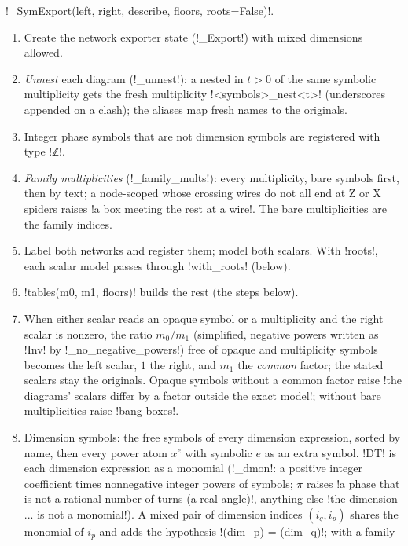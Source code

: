 {{{\begin{algorithm}\label{alg:lean-export-sym-init}
\lexpy!_SymExport(left, right, describe, floors, roots=False)!.
\begin{enumerate}
\item Create the network exporter state (\lexpy!_Export!) with mixed dimensions allowed.
\item \emph{Unnest} each diagram (\lexpy!_unnest!): a \bbox nested in $t>0$ \bboxes of the same
symbolic multiplicity gets the fresh multiplicity \lexcode!<symbols>_nest<t>! (underscores
appended on a clash); the aliases map fresh names to the originals.
\item Integer phase symbols that are not dimension symbols are registered with type
\lexlean!ℤ!.
\item \emph{Family multiplicities} (\lexpy!_family_mults!): every \bbox multiplicity, bare symbols
first, then by text; a node-scoped \bbox whose crossing wires do not all end at Z or X spiders
raises \lexcode!a box meeting the rest at a wire!. The bare multiplicities are the family indices.
\item Label both networks and register them; model both scalars. With \lexpy!roots!, each scalar
model passes through \lexpy!with_roots! (below).
\item \lexpy!tables(m0, m1, floors)! builds the rest (the steps below).
\item When either scalar reads an opaque symbol or a multiplicity and the right scalar is
nonzero, the ratio $m_0/m_1$ (simplified, negative powers written as \lexpy!Inv! by
\lexpy!_no_negative_powers!) free of opaque and multiplicity symbols becomes the left scalar, $1$
the right, and $m_1$ the \emph{common} factor; the stated scalars stay the originals. Opaque
symbols without a common factor raise
\lexcode!the diagrams' scalars differ by a factor outside the exact model!; \bboxes without bare
multiplicities raise \lexcode!bang boxes!.
\item Dimension symbols: the free symbols of every dimension expression, sorted by name, then
every power atom $x^{e}$ with symbolic $e$ as an extra symbol. \lexlean!DT! is each dimension
expression as a monomial (\lexpy!_dmon!: a positive integer coefficient times nonnegative integer
powers of symbols; $\pi$ raises
\lexcode!a phase that is not a rational number of turns (a real angle)!, anything else
\lexcode!the dimension ... is not a monomial!). A mixed pair of dimension indices $(i_q, i_p)$
shares the monomial of $i_p$ and adds the hypothesis \lexlean!(dim_p) = (dim_q)!; with a family

\end{enumerate}
\end{algorithm}}}}

